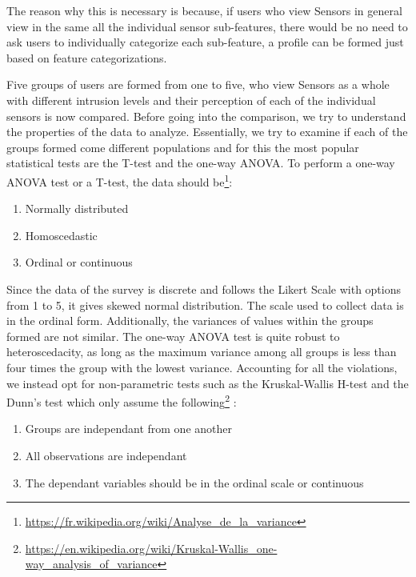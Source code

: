 The reason why this is necessary is because, if users who view Sensors in general view in the same all the individual sensor sub-features, there would be no need to ask users to individually categorize each sub-feature, a profile can be formed just based on feature categorizations.

Five groups of users are formed from one to five, who view Sensors as a whole with different intrusion levels and their perception of each of the individual sensors is now compared. Before going into the comparison, we try to understand the properties of the data to analyze. Essentially, we try to examine if each of the groups formed come different populations and for this the most popular statistical tests are the T-test and the one-way ANOVA. To perform a one-way ANOVA test or a T-test, the data should be\footnote{\url{https://fr.wikipedia.org/wiki/Analyse\_de\_la\_variance}}:

\begin{enumerate}
\item Normally distributed
\item Homoscedastic
\item Ordinal or continuous
\end{enumerate}

Since the data of the survey is discrete and follows the Likert Scale with options from 1 to 5, it gives skewed normal distribution. The scale used to collect data is in the ordinal form. Additionally, the variances of values within the groups formed are not similar. The one-way ANOVA test is quite robust to heteroscedacity, as long as the maximum variance among all groups is less than four times the group with the lowest variance.  Accounting for all the violations, we instead opt for non-parametric tests such as the Kruskal-Wallis H-test and the Dunn's test
which only assume the following\footnote{\url{https://en.wikipedia.org/wiki/Kruskal-Wallis\_one-way\_analysis\_of\_variance}} : 

\begin{enumerate}
\item Groups are independant from one another
\item All observations are independant
\item The dependant variables should be in the ordinal scale or continuous
\end{enumerate}

